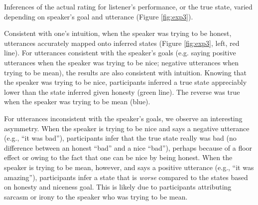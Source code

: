 \documentclass[10pt,letterpaper]{article}
\begin{document}

Inferences of the actual rating for listener's performance, or the true state, varied depending on speaker's goal and utterance (Figure \ref{fig:exp3}).


Consistent with one's intuition, when the speaker was trying to be honest, utterances accurately mapped onto inferred states (Figure \ref{fig:exp3}, left, red line).
For utterances consistent with the speaker's goals (e.g. saying positive utterances when the speaker was trying to be nice; negative utterances when trying to be mean), the results are also consistent with intuition.
Knowing that the speaker was trying to be nice, participants inferred a true state appreciably lower than the state inferred given honesty (green line).
The reverse was true when the speaker was trying to be mean (blue).


For utterances inconsistent with the speaker's goals, we observe an interesting asymmetry.
When the speaker is trying to be nice and says a negative utterance (e.g., ``it was bad''), participants infer that the true state really was bad (no difference between an honest ``bad'' and a nice ``bad''), perhaps because of a floor effect or owing to the fact that one can be nice by being honest.
When the speaker is trying to be mean, however, and says a positive utterance (e.g., ``it was amazing''), participants infer a state that is \emph{worse} compared to the states based on honesty and niceness goal.
This is likely due to participants attributing sarcasm or irony to the speaker who was trying to be mean.
\end{document}
